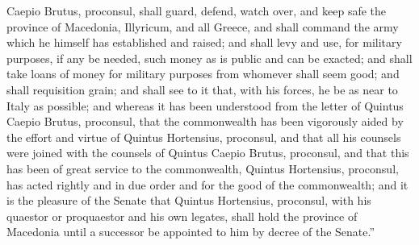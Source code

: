  Caepio Brutus, proconsul, shall guard, defend, watch over, and keep safe the province of Macedonia, Illyricum, and all Greece, and shall command the army which he himself has established and raised; and shall levy and use, for military purposes, if any be needed, such money as is public and can be exacted; and shall take loans of money for military purposes from whomever shall seem good; and shall requisition grain; and shall see to it that, with his forces, he be as near to Italy as possible; and whereas it has been understood from the letter of Quintus Caepio Brutus, proconsul, that the commonwealth has been vigorously aided by the effort and virtue of Quintus Hortensius, proconsul, and that all his counsels were joined with the counsels of Quintus Caepio Brutus, proconsul, and that this has been of great service to the commonwealth, Quintus Hortensius, proconsul, has acted rightly and in due order and for the good of the commonwealth; and it is the pleasure of the Senate that Quintus Hortensius, proconsul, with his quaestor or proquaestor and his own legates, shall hold the province of Macedonia until a successor be appointed to him by decree of the Senate.''
